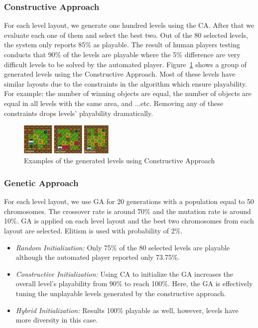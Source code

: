 \documentclass[letterpaper]{article}
\newcommand{\figref}[1]{Figure~\ref{Figure:#1}}
\begin{document}
\subsubsection{Constructive Approach}
For each level layout, we generate one hundred levels using the CA. After that we evaluate each one of them and select the best two. Out of the 80 selected levels, the system only reports 85\% as playable. The result of human players testing conducts that 90\% of the levels are playable where the 5\% difference are very difficult levels to be solved by the automated player. \figref{constructiveExamples} shows a group of generated levels using the Constructive Approach. Most of these levels have similar layouts due to the constraints in the algorithm which ensure playability. For example: the number of winning objects are equal, the number of objects are equal in all levels with the same area, and ...etc. Removing any of these constraints drops levels' playability dramatically.

\begin{figure}[ht]
  	\centering
    \includegraphics[width=0.4\textwidth]{Images/constructiveExamples}
    \caption{Examples of the generated levels using Constructive Approach}
    \label{Figure:constructiveExamples}
\end{figure}

\subsubsection{Genetic Approach}
For each level layout, we use GA for 20 generations with a population equal to 50 chromosomes. The crossover rate is around 70\% and the mutation rate is around 10\%. GA is applied on each level layout and the best two chromosomes from each layout are selected. Elitism is used with probability of 2\%.
\begin{itemize}
	\item \emph{Random Initialization:} Only 75\% of the 80 selected levels are playable although the automated player reported only 73.75\%.
	\item \emph{Constructive Initialization:} Using CA to initialize the GA increases the overall level's playability from 90\% to reach 100\%. Here, the GA is effectively tuning the unplayable levels generated by the constructive approach.
	\item \emph{Hybrid Initialization:} Results 100\% playable as well, however, levels have more diversity in this case.
\end{itemize}
\end{document}
